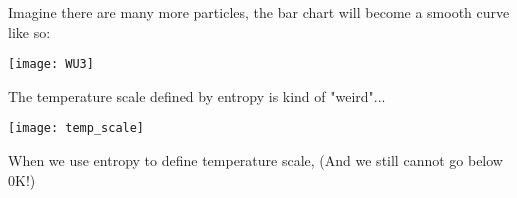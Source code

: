 \documentclass[class=article, crop=false, 12pt]{standalone}
\begin{document}
\newpage
Imagine there are many more particles,
the bar chart will become a smooth curve like so:

\begin{center}
    \begin{minipage}{0.8\linewidth}
        \centering
        \texttt{[image: WU3]}
    \end{minipage}
\end{center}

The temperature scale defined by entropy is kind of "weird"...

\begin{center}
    \begin{minipage}{0.7\linewidth}
        \centering
        \texttt{[image: temp\_scale]}
    \end{minipage}
\end{center}

When we use entropy to define temperature scale, 
(And we still cannot go below $0$K!)


\theend
\end{document}
